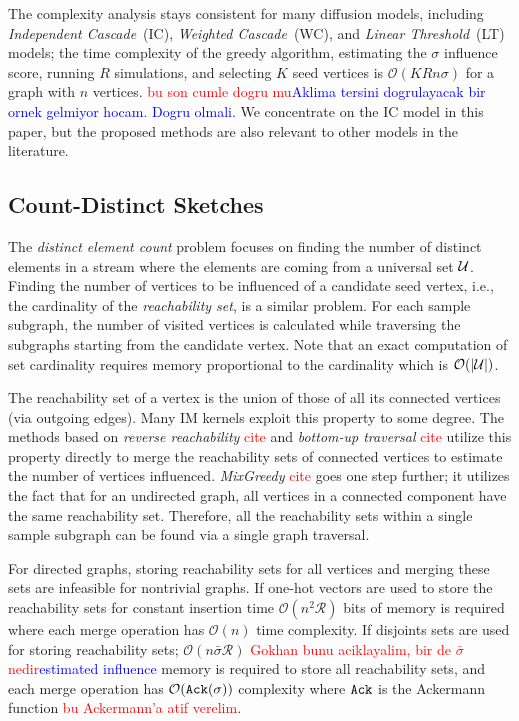 \documentclass[10pt,journal,compsoc]{IEEEtran}
\newcommand\ggx[1]{\textcolor{blue}{#1}}
\newcommand\kktodo[1]{\textcolor{red}{#1}}
\begin{document}
The complexity analysis stays consistent for many diffusion models, including {\em Independent Cascade}~(IC), {\em Weighted Cascade}~(WC), and {\em Linear Threshold}~(LT)  models; the time complexity of the greedy algorithm, estimating the $\sigma$ influence score, running $R$ simulations, and selecting $K$ seed vertices is $\mathcal{O}(KRn\sigma)$ for a graph with $n$ vertices. \kktodo{bu son cumle dogru mu}\ggx{Aklima tersini dogrulayacak bir ornek gelmiyor hocam. Dogru olmali.} We concentrate on the IC model in this paper, but the proposed methods are also relevant to other models in the literature.

\subsection{Count-Distinct Sketches}\label{sec:sketch}
The {\em distinct element count} problem focuses on finding the number of distinct elements in a stream where the elements are coming from a universal set ${\cal U}$. Finding the number of vertices to be influenced of a candidate seed vertex, i.e., the cardinality of the {\em reachability set}, is a similar problem. For each sample subgraph, the number of visited vertices is calculated while traversing the subgraphs starting from the candidate vertex. Note that an exact computation of set cardinality requires memory proportional to the cardinality which is ${\mathcal O}(|{\cal U}|)$. 

The reachability set of a vertex is the union of those of all its connected vertices (via outgoing edges). Many IM kernels exploit this property to some degree. The methods based on {\em reverse reachability} \kktodo{cite} and {\em bottom-up traversal} \kktodo{cite} utilize this property directly to merge the reachability sets of connected vertices to estimate the number of vertices influenced. {\em MixGreedy} \kktodo{cite} goes one step further; it utilizes the fact that for an undirected graph, all vertices in a connected component have the same reachability set. Therefore, all the reachability sets within a single sample subgraph can be found via a single graph traversal. 

For directed graphs, storing reachability sets for all vertices and merging these sets are infeasible for nontrivial graphs. 
If one-hot vectors are used to store the reachability sets for constant insertion time $\mathcal{O}(n^2\mathcal{R})$ bits of memory is required where each merge operation has $\mathcal{O}(n)$ time complexity. 
If disjoints sets are used for storing reachability sets; $\mathcal{O}(n\bar{\sigma}\mathcal{R})$ \kktodo{Gokhan bunu aciklayalim, bir de $\bar{\sigma}$ nedir}\ggx{estimated influence} memory is required to store all reachability sets, and each merge operation has $\mathcal{O}({\tt Ack}(\sigma))$ complexity where ${\tt Ack}$ is the Ackermann function \kktodo{bu Ackermann'a atif verelim}.
\end{document}
